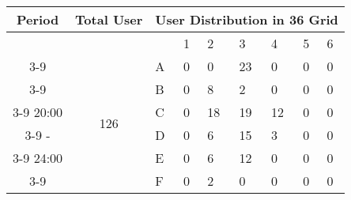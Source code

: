 \begin{table*}[hpt]
\begin{minipage}{.5\linewidth}
\begin{tabular}{|c|c|p{0.4cm}|p{0.4cm}|p{0.4cm}|p{0.4cm}|p{0.4cm}|p{0.4cm}|p{0.4cm}|}
\hline	
\end{tabular}	
\vspace*{0.1in} \\	
\begin{tabular}{|c|c|p{0.4cm}|p{0.4cm}|p{0.4cm}|p{0.4cm}|p{0.4cm}|p{0.4cm}|p{0.4cm}|}	
\hline	
Period & Total User &\multicolumn{7}{c|}{User Distribution in 36 Grid} \\	
\hline	
&& & 1 &2 & 3 & 4 & 5&6\\	
\cline{3-9}	
 & \multirow{7}{*}{126}	
 &A	
& 0& 0& 23& 0& 0& 0  \\	
\cline{3-9}	
 && B	
& 0& 8& 2& 0& 0& 0  \\	
\cline{3-9}	
20:00 && C	
& 0& 18& 19& 12& 0& 0  \\	
\cline{3-9}	
 -&& D 	
& 0& 6& 15& 3& 0& 0  \\	
\cline{3-9}	
24:00 && E 	
& 0& 6& 12& 0& 0& 0  \\	
\cline{3-9}	
 && F 	
& 0& 2& 0& 0& 0& 0  \\	
\hline	
\end{tabular}	
\vspace*{0.1in} \\	
\end{minipage}	
\label{table:sanantonio_cluster}	
\caption{User Distribution in Districts of San Antonio}	
\end{table*}	
